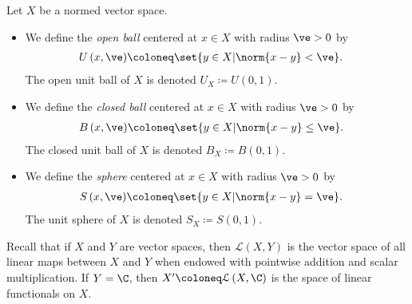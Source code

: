 \documentclass[10pt]{mypackage2}
\begin{document}
\begin{definition}
  Let $X$ be a normed vector space.
  \begin{itemize}
    \item We define the \textit{open ball} centered at $x\in X$ with radius $\ve > 0$ by
      \begin{align*}
        U\left( x,\ve \right) &\coloneq \set{y\in X | \norm{x-y} < \ve}.
      \end{align*}
      The open unit ball of $X$ is denoted $U_{X}\coloneq U\left( 0,1 \right)$.
    \item We define the \textit{closed ball} centered at $x\in X$ with radius $\ve > 0$ by
      \begin{align*}
        B\left( x,\ve \right) &\coloneq \set{y\in X | \norm{x-y} \leq \ve}.
      \end{align*}
      The closed unit ball of $X$ is denoted $B_{X}\coloneq B\left( 0,1 \right)$.
    \item We define the \textit{sphere} centered at $x\in X$ with radius $\ve > 0$ by
      \begin{align*}
        S\left( x,\ve \right) &\coloneq \set{y\in X | \norm{x-y} = \ve}.
      \end{align*}
      The unit sphere of $X$ is denoted $S_{X}\coloneq S\left( 0,1 \right)$.
  \end{itemize}
\end{definition}
Recall that if $X$ and $Y$ are vector spaces, then $\mathcal{L}\left( X,Y \right)$ is the vector space of all linear maps between $X$ and $Y$ when endowed with pointwise addition and scalar multiplication. If $Y = \C$, then $X' \coloneq \mathcal{L}\left( X,\C \right)$ is the space of linear functionals on $X$.\newline
\end{document}

